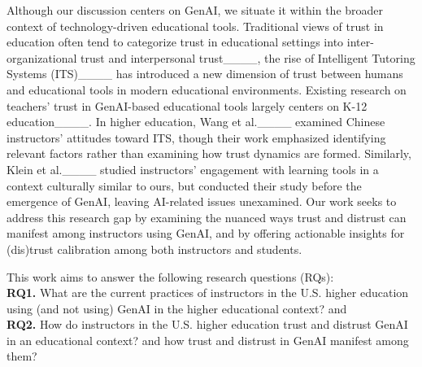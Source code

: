 Although our discussion centers on GenAI, we situate it within the broader context of technology-driven educational tools. Traditional views of trust in education often tend to categorize trust in educational settings into inter-organizational trust and interpersonal trust____, the rise of Intelligent Tutoring Systems (ITS)____ has introduced a new dimension of trust between humans and educational tools in modern educational environments. Existing research on teachers' trust in GenAI-based educational tools largely centers on K-12 education____. In higher education, Wang et al.____ examined Chinese instructors’ attitudes toward ITS, though their work emphasized identifying relevant factors rather than examining how trust dynamics are formed. Similarly, Klein et al.____ studied instructors’ engagement with learning tools in a context culturally similar to ours, but conducted their study before the emergence of GenAI, leaving AI-related issues unexamined. Our work seeks to address this research gap by examining the nuanced ways trust and distrust can manifest among instructors using GenAI, and by offering actionable insights for (dis)trust calibration among both instructors and students.

This work aims to answer the following research questions (RQs): \\
    \textbf{RQ1.} What are the current practices of instructors in the U.S. higher education using (and not using) GenAI in the higher educational context? and \\
    \textbf{RQ2.} How do instructors in the U.S. higher education trust and distrust GenAI in an educational context? and how trust and distrust in GenAI manifest among them? 


